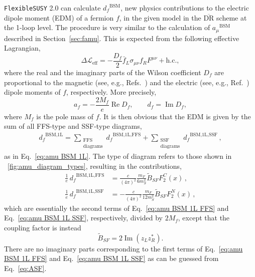 \documentclass[final,3p,11pt,pdflatex]{elsarticle}
\makeatletter
\newcommand{\fs}{\texttt{FlexibleSUSY}\@\xspace}
\newcommand{\fstwo}{\fs 2.0\@\xspace}
\newcommand{\ol}[1]{\overline{#1}}
\newcommand{\DRbar}{\ensuremath{\ol{\text{DR}}}\xspace}
\newcommand{\BSM}{\ensuremath{\text{BSM}}\xspace}
\newcommand{\amu}{\ensuremath{a_\mu}\xspace}
\newcommand{\amuBSM}{\ensuremath{\amu^{\BSM}}\xspace}
\newcommand{\edm}[1]{\ensuremath{d_{#1}}\xspace}
\newcommand{\edmBSM}[1]{\ensuremath{\edm{#1}^{\BSM}}\xspace}
\newcommand{\figref}[1]{\figurename~\ref{#1}}
\newcommand{\secref}[1]{Section~\ref{#1}}
\DeclareMathOperator{\re}{Re}
\DeclareMathOperator{\im}{Im}
\makeatother
\begin{document}
\fstwo can calculate $\edmBSM{f}$, new physics contributions to the
electric dipole moment (EDM) of a fermion $f$, in the given model
in the \DRbar scheme at the 1-loop level.
The procedure is very similar to the calculation of \amuBSM
described in \secref{sec:famu}.
This is expected from the following effective Lagrangian,
\begin{equation}
  \Delta \mathcal{L}_\text{eff} =
  - \frac{D_f}{2}\bar{f}_L \sigma_{\mu\nu} f_R F^{\mu\nu} + \mathrm{h.c.},
\end{equation}
where the real and the imaginary parts of the Wilson coefficient
$D_f$ are proportional to the magnetic
(see, e.g., Refs.~\cite{Cho:2001hx,Baek:2002cc})
and the electric (see, e.g., Ref.~\cite{Pokorski:1999hz}) dipole moments
of $f$, respectively.
More precisely,
\begin{equation}
  a_f = - \frac{2 M_f}{e} \re D_f, \qquad
  \edm{f} = \im D_f,
\end{equation}
where $M_f$ is the pole mass of $f$.
It is then obvious that
the EDM is given by the sum of all FFS-type and SSF-type diagrams,
\begin{align}
  \edm{f}^{\BSM\text{,1L}} =
  \sum_{\substack{\text{FFS}\\\text{diagrams}}}
  \edm{f}^{\BSM\text{,1L,FFS}}
  + \sum_{\substack{\text{SSF}\\\text{diagrams}}}
  \edm{f}^{\BSM\text{,1L,SSF}}
  \,,
\end{align}
as in Eq.\ \eqref{eq:amu BSM 1L}.  The type of diagram refers to those
shown in \figref{fig:amu_diagram_types}, resulting in the contributions,
\begin{align}
  \frac{1}{e}\,\edm{f}^{\BSM\text{,1L,FFS}} &=
  \frac{c}{(4\pi)^2}
    \frac{m_F}{6{m_{S}^2}} \widetilde{B}_{SF} F_2^C(x)
  \,, \\
  \frac{1}{e}\,\edm{f}^{\BSM\text{,1L,SSF}} &=
  - \frac{c}{(4\pi)^2}
    \frac{m_F}{12{m_{S}^2}} \widetilde{B}_{SF} F_2^N(x)
  \,,
\end{align}
which are essentially the second terms of Eq.\ \eqref{eq:amu BSM 1L FFS} and
Eq.\ \eqref{eq:amu BSM 1L SSF}, respectively, divided by $2 M_f$, except that
the coupling factor is instead
\begin{equation}
  \widetilde{B}_{SF} = 2 \im ( z_L z_R^* ) .
\end{equation}
There are no imaginary parts corresponding to
the first terms of Eq.\ \eqref{eq:amu BSM 1L FFS} and Eq.\ \eqref{eq:amu BSM 1L SSF}
as can be guessed from Eq.\ \eqref{eq:ASF}.
\end{document}
